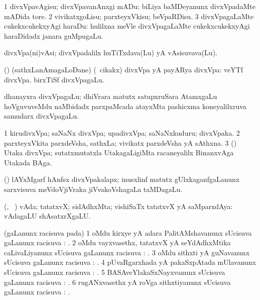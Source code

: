 \bentry
{}
\gl{\sakirx}
\bmng
\bnum
\num{1} divxVpavAgisu; divxVpavanAnxgi mADu:  biLiya baMDeyanunx divxVpadaMte mADida tore. 
\num{2} vivikatxgoLisu; parxteyxVkisu; beVpaRDisu. 
\num{3} divxVpagaLaMte cukekxcukekxyAgi haraDu:  hulilxna meVle divxVpagaLaMte cukekxcukekxyAgi haraDidadx janara guMpugaLu. 
\enum
\emng
\eentry

\bentry
{}
\gl{\nA}
\bmng
divxVpa(ni)vAsi; divxVpadalilx huTiTxdava(Lu) yA vAsisuvava(Lu). 
\emng
\eentry

\bentry
{}
\gl{\nA}
\bmng
(\kAparx) (sathxLanAmagaLoDane) (\kanmu\ cikakx) divxVpa yA payARya divxVpa:  veYTf divxVpa.  birxTiSf divxVpagaLu. 
\emng

\noindent 
\gl{\pagu}
\bmng
{} dhanayxra divxVpagaLu; dhiVrara matutx satupxruSara AtamxgaLu hoVguvuveMdu naMbidadx parxpaMcada atayxMta pashicxma koneyalilxruva samudarx divxVpagaLu. 
\emng
\eentry

\bentry
{}
\gl{\nA}
\bmng
\bnum
\num{1} kirudivxVpa; saNaNx divxVpa; upadivxVpa; saNaNxkuduru; divxVpaka. 
\num{2} parxteyxVkita parxdeVsha, sathxLa; vivikatx parxdeVsha yA sAthxna. 
\num{3} (\aMrashA) Utaka divxVpa; sutatxmutatxla UtakagaLigiMta racaneyalilx BinanxvAga Utakada BAga. 
\enum
\emng
\eentry

\bentry
{}
\gl{\nA}
\bmng
(\shavi) lAYxMgarf hAnfsx divxVpakalapx; inusxlinf matutx gUlxkaganfgaLanunx sarxvisuva meVdoVjiVraka jiVvakoVshagaLa taMDagaLu. 
\emng
\eentry

\bentry
{}
\gl{\nA}
\bmng
(\AmA, \sA\ \hiV) vAda; tatatxvX; sidAdhxMta; vishiSaTx tatatxvX yA saMparxdAya:  vAdagaLU shAsatxrXgaLU. 
\emng
\eentry

\bentry
{}
\gl{\uparx}
\bmng
(\nA gaLanunx racisuva pada) 
\bnum
\num{1} oMdu kirxye yA adara PalitAMshavanunx sUcisuva \nA gaLanunx racisuva \uparx: . 
\num{2} oMdu vayxvasethx, tatatxvX yA seYdAdhxMtika caLivaLiyanunx sUcisuva \nA gaLanunx racisuva \uparx: . 
\num{3} oMdu sithxti yA guNavanunx sUcisuva \nA gaLanunx racisuva \uparx: . 
\num{4} pUvaRgarxhada yA pakaSxpAtada mUlavanunx sUcisuva \nA gaLanunx racisuva \uparx: . 
\num{5} BASAveYlakaSxNayxvanunx sUcisuva \nA gaLanunx racisuva \uparx: . 
\num{6} rugANxvasethx yA roVga sithxtiyanunx sUcisuva \nA gaLanunx racisuva \uparx: . 
\enum
\emng
\eentry

